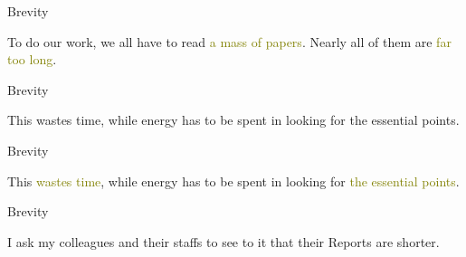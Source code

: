 \documentclass[
  ignorenonframetext,
]{beamer}
\begin{document}
\begin{frame}{Brevity}
\protect\hypertarget{brevity-2}{}
\Large

To do our work, we all have to read \textcolor{olive}{a mass of papers}.
Nearly all of them are \textcolor{olive}{far too long}.

\par

\vfill
\Huge


\vfill
\end{frame}

\begin{frame}{Brevity}
\protect\hypertarget{brevity-3}{}
\Large

This wastes time, while energy has to be spent in looking for the
essential points.

\par

\vfill\Huge


\vfill

\mbox{}
\end{frame}

\begin{frame}{Brevity}
\protect\hypertarget{brevity-4}{}
\Large

This \textcolor{olive}{wastes time}, while energy has to be spent in
looking for \textcolor{olive}{the essential points}.

\par

\vfill\Huge


\vfill
\end{frame}

\begin{frame}{Brevity}
\protect\hypertarget{brevity-5}{}
\Large

I ask my colleagues and their staffs to see to it that their Reports are
shorter.

\vfill\Huge


\vfill
\end{frame}
\end{document}
